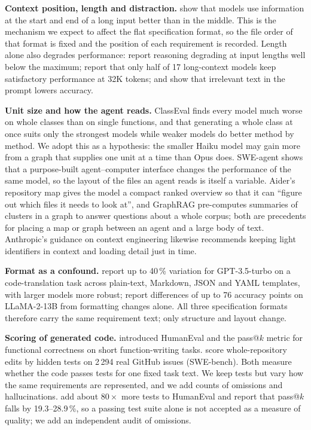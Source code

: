 \documentclass{article}
\begin{document}
\textbf{Context position, length and distraction.} \citet{liu2024lost} show that models use information at the
start and end of a long input better than in the middle. This is the mechanism we expect to affect the flat
specification format, so the file order of that format is fixed and the position of each requirement is recorded.
Length alone also degrades performance: \citet{levy2024moretokens} report reasoning degrading at input lengths well
below the maximum; \citet{hsieh2024ruler} report that only half of 17 long-context models keep satisfactory performance
at 32K tokens; and \citet{shi2023distracted} show that irrelevant text in the prompt lowers accuracy.

\textbf{Unit size and how the agent reads.} ClassEval \citep{du2023classeval} finds every model much worse on whole
classes than on single functions, and that generating a whole class at once suits only the strongest models while
weaker models do better method by method. We adopt this as a hypothesis: the smaller Haiku model may gain more from a
graph that supplies one unit at a time than Opus does. SWE-agent \citep{yang2024sweagent} shows that a purpose-built
agent--computer interface changes the performance of the same model, so the layout of the files an agent reads is itself
a variable. Aider's repository map \citep{aider_repomap} gives the model a compact ranked overview so that it can
``figure out which files it needs to look at'', and GraphRAG \citep{edge2024graphrag} pre-computes summaries of clusters
in a graph to answer questions about a whole corpus; both are precedents for placing a map or graph between an agent and
a large body of text. Anthropic's guidance on context engineering \citep{anthropic2025context} likewise recommends keeping
light identifiers in context and loading detail just in time.

\textbf{Format as a confound.} \citet{he2024format} report up to 40\,\% variation for GPT-3.5-turbo on a code-translation
task across plain-text, Markdown, JSON and YAML templates, with larger models more robust; \citet{sclar2024format} report
differences of up to 76 accuracy points on LLaMA-2-13B from formatting changes alone. All three specification formats
therefore carry the same requirement text; only structure and layout change.

\textbf{Scoring of generated code.} \citet{chen2021codex} introduced HumanEval and the pass@$k$ metric for
functional correctness on short function-writing tasks. \citet{jimenez2024swebench} score whole-repository
edits by hidden tests on 2\,294 real GitHub issues (SWE-bench). Both measure whether the code passes tests
for one fixed task text. We keep tests but vary how the same requirements are represented, and we add counts
of omissions and hallucinations. \citet{liu2023evalplus} add about $80\times$ more tests to HumanEval and report
that pass@$k$ falls by 19.3--28.9\,\%, so a passing test suite alone is not accepted as a measure of quality;
we add an independent audit of omissions.
\end{document}
